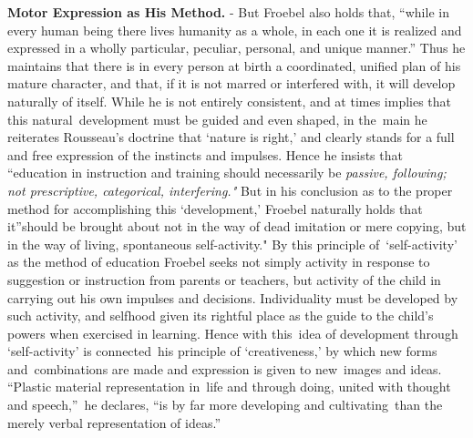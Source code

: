 \documentclass[]{book}
\begin{document}
\textbf{Motor Expression as His Method.} - But Froebel also holds that, ``while in every human being there lives humanity as a whole, in each one it is realized and expressed in a wholly particular, peculiar, personal, and unique manner.'' Thus he maintains that there is in every person at birth a coordinated, unified plan of his mature character, and that, if it is not marred or interfered with, it will develop naturally of itself. While he is not entirely consistent, and at times implies that this natural~development must be guided and even shaped, in the~main he reiterates Rousseau's doctrine that `nature is right,' and clearly stands for a full and free expression of the instincts and impulses. Hence he insists that ``education in instruction and training should necessarily be \emph{passive, following; not prescriptive, categorical, interfering."} But in his conclusion as to the proper method for accomplishing this `development,' Froebel naturally holds that it''should be brought about not in the way of dead imitation or mere copying, but in the way of living, spontaneous self-activity." By this principle of~`self-activity' as the method of education Froebel seeks not simply activity in response to suggestion or instruction from parents or teachers, but activity of the child in carrying out his own impulses and decisions. Individuality must be developed by such activity, and selfhood given its rightful place as the guide to the child's powers when exercised in learning. Hence with this~idea of development through `self-activity' is connected~his principle of `creativeness,' by which new forms and~combinations are made and expression is given to new~images and ideas. ``Plastic material representation in~life and through doing, united with thought and speech,''~he declares, ``is by far more developing and cultivating~than the merely verbal representation of ideas.''
\end{document}
